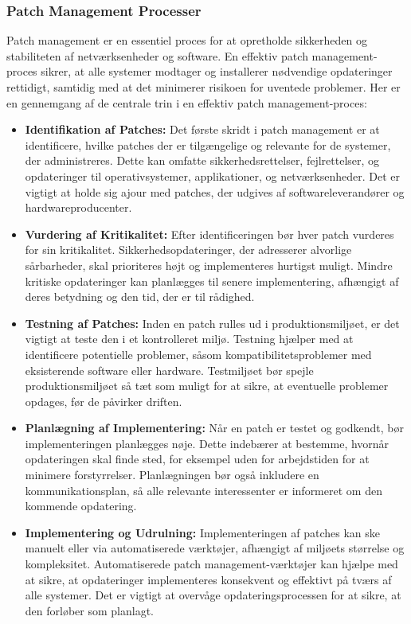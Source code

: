\subsubsection{Patch Management Processer}
Patch management er en essentiel proces for at opretholde sikkerheden og stabiliteten af netværksenheder og software. En effektiv patch management-proces sikrer, at alle systemer modtager og installerer nødvendige opdateringer rettidigt, samtidig med at det minimerer risikoen for uventede problemer. Her er en gennemgang af de centrale trin i en effektiv patch management-proces:

\begin{itemize}
	\item \textbf{Identifikation af Patches:} Det første skridt i patch management er at identificere, hvilke patches der er tilgængelige og relevante for de systemer, der administreres. Dette kan omfatte sikkerhedsrettelser, fejlrettelser, og opdateringer til operativsystemer, applikationer, og netværksenheder. Det er vigtigt at holde sig ajour med patches, der udgives af softwareleverandører og hardwareproducenter.
	
	\item \textbf{Vurdering af Kritikalitet:} Efter identificeringen bør hver patch vurderes for sin kritikalitet. Sikkerhedsopdateringer, der adresserer alvorlige sårbarheder, skal prioriteres højt og implementeres hurtigst muligt. Mindre kritiske opdateringer kan planlægges til senere implementering, afhængigt af deres betydning og den tid, der er til rådighed.
	
	\item \textbf{Testning af Patches:} Inden en patch rulles ud i produktionsmiljøet, er det vigtigt at teste den i et kontrolleret miljø. Testning hjælper med at identificere potentielle problemer, såsom kompatibilitetsproblemer med eksisterende software eller hardware. Testmiljøet bør spejle produktionsmiljøet så tæt som muligt for at sikre, at eventuelle problemer opdages, før de påvirker driften.
	
	\item \textbf{Planlægning af Implementering:} Når en patch er testet og godkendt, bør implementeringen planlægges nøje. Dette indebærer at bestemme, hvornår opdateringen skal finde sted, for eksempel uden for arbejdstiden for at minimere forstyrrelser. Planlægningen bør også inkludere en kommunikationsplan, så alle relevante interessenter er informeret om den kommende opdatering.
	
	\item \textbf{Implementering og Udrulning:} Implementeringen af patches kan ske manuelt eller via automatiserede værktøjer, afhængigt af miljøets størrelse og kompleksitet. Automatiserede patch management-værktøjer kan hjælpe med at sikre, at opdateringer implementeres konsekvent og effektivt på tværs af alle systemer. Det er vigtigt at overvåge opdateringsprocessen for at sikre, at den forløber som planlagt.
	

\end{itemize}

